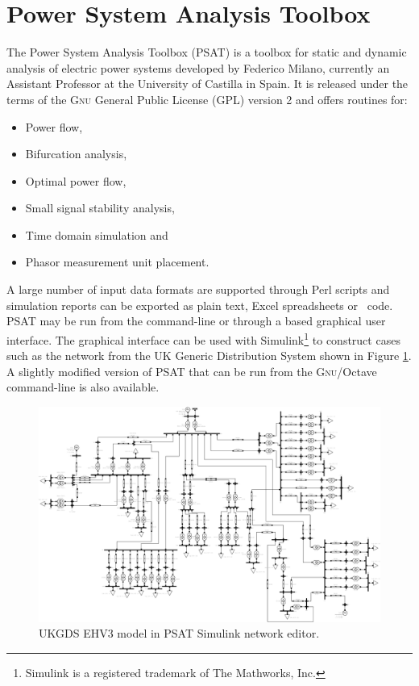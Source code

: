 \section{Power System Analysis Toolbox}
\label{sec:psat}
The Power System Analysis Toolbox (PSAT) is a \matlab toolbox for static and
dynamic analysis of electric power systems developed by Federico Milano,
currently an Assistant Professor at the University of Castilla in Spain. It is
released under the terms of the \textsc{Gnu} General Public License (GPL)
version 2 and offers routines for:
\begin{itemize}
	\item Power flow,
	\item Bifurcation analysis,
	\item Optimal power flow,
	\item Small signal stability analysis,
	\item Time domain simulation and
	\item Phasor measurement unit placement.
\end{itemize}
A large number of input data formats are supported through Perl scripts and
simulation reports can be exported as plain text, Excel spreadsheets or
\LaTeXe~code.  PSAT may be run from the \matlab command-line or through a
\matlab based graphical user interface.  The graphical interface can be used with
Simulink\footnote{Simulink is a registered trademark of The Mathworks, Inc.}
to construct cases such as the network from the UK Generic Distribution System
shown in Figure \ref{fig:ukgds_ehv3}.  A slightly modified version of PSAT that
can be run from the \textsc{Gnu}/Octave command-line is also available.

\begin{figure}
  \centering
  \includegraphics[width=20cm,angle=90]{figures/psat}
  \caption{UKGDS EHV3 model in PSAT Simulink network editor.}
  \label{fig:ukgds_ehv3}
\end{figure}

